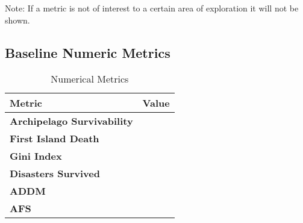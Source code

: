 Note: If a metric is not of interest to a certain area of exploration it will not be shown.

\subsection{Baseline Numeric Metrics}
\label{subsec:Simulations:baseline:num_metrics}
\begin{table}[htb]
    \centering
    \begin{tabular}{|l|l|}
    \hline
    \textbf{Metric}                     & \textbf{Value} \\ \hline
    \textbf{Archipelago Survivability}  &       \\
    \textbf{First Island Death}         &       \\
    \textbf{Gini Index}                 &       \\
    \textbf{Disasters Survived}         &       \\
    \textbf{ADDM}                       &       \\
    \textbf{AFS}                        &       \\ \hline
\end{tabular}
\caption{Numerical Metrics}
\end{table}

